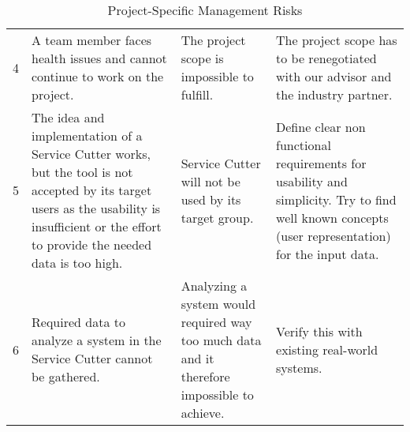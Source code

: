 \begin{table}[H]
\begin{tabular}{|c|p{120pt} p{100pt} p{140pt}|}
4 & A team member faces health issues and cannot continue to work on the project. & The project scope is impossible to fulfill. & The project scope has to be renegotiated with our advisor and the industry partner. \\ 
5 & The idea and implementation of a Service Cutter works, but the tool is not accepted by its target users as the usability is insufficient or the effort to provide the needed data is too high. & Service Cutter will not be used by its target group. & Define clear non functional requirements for usability and simplicity. Try to find well known concepts (user representation) for the input data. \\
6 & Required data to analyze a system in the Service Cutter cannot be gathered. & Analyzing a system would required way too much data and it therefore impossible to achieve. & Verify this with existing real-world systems. \\
\hline
\end{tabular}
\caption{Project-Specific Management Risks}
\label{tab:projmgmtrisks}
\end{table}


